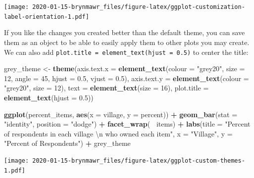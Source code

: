 \documentclass[]{book}
\newenvironment{Shaded}{\begin{snugshade}}{\end{snugshade}}
\newcommand{\KeywordTok}[1]{\textcolor[rgb]{0.13,0.29,0.53}{\textbf{#1}}}
\newcommand{\DataTypeTok}[1]{\textcolor[rgb]{0.13,0.29,0.53}{#1}}
\newcommand{\DecValTok}[1]{\textcolor[rgb]{0.00,0.00,0.81}{#1}}
\newcommand{\FloatTok}[1]{\textcolor[rgb]{0.00,0.00,0.81}{#1}}
\newcommand{\CharTok}[1]{\textcolor[rgb]{0.31,0.60,0.02}{#1}}
\newcommand{\StringTok}[1]{\textcolor[rgb]{0.31,0.60,0.02}{#1}}
\newcommand{\OperatorTok}[1]{\textcolor[rgb]{0.81,0.36,0.00}{\textbf{#1}}}
\newcommand{\NormalTok}[1]{#1}
\begin{document}
\texttt{[image: 2020-01-15-brynmawr\_files/figure-latex/ggplot-customization-label-orientation-1.pdf]}

If you like the changes you created better than the default theme, you
can save them as an object to be able to easily apply them to other
plots you may create. We can also add
\texttt{plot.title\ =\ element\_text(hjust\ =\ 0.5)} to center the
title:

\begin{Shaded}
\begin{Highlighting}[]
\NormalTok{grey_theme <-}\StringTok{ }\KeywordTok{theme}\NormalTok{(}\DataTypeTok{axis.text.x =} \KeywordTok{element_text}\NormalTok{(}\DataTypeTok{colour =} \StringTok{"grey20"}\NormalTok{, }\DataTypeTok{size =} \DecValTok{12}\NormalTok{, }\DataTypeTok{angle =} \DecValTok{45}\NormalTok{, }\DataTypeTok{hjust =} \FloatTok{0.5}\NormalTok{, }\DataTypeTok{vjust =} \FloatTok{0.5}\NormalTok{),}
                    \DataTypeTok{axis.text.y =} \KeywordTok{element_text}\NormalTok{(}\DataTypeTok{colour =} \StringTok{"grey20"}\NormalTok{, }\DataTypeTok{size =} \DecValTok{12}\NormalTok{),}
                    \DataTypeTok{text =} \KeywordTok{element_text}\NormalTok{(}\DataTypeTok{size =} \DecValTok{16}\NormalTok{),}
                    \DataTypeTok{plot.title =} \KeywordTok{element_text}\NormalTok{(}\DataTypeTok{hjust =} \FloatTok{0.5}\NormalTok{))}


\KeywordTok{ggplot}\NormalTok{(percent_items, }\KeywordTok{aes}\NormalTok{(}\DataTypeTok{x =}\NormalTok{ village, }\DataTypeTok{y =}\NormalTok{ percent)) }\OperatorTok{+}
\StringTok{    }\KeywordTok{geom_bar}\NormalTok{(}\DataTypeTok{stat =} \StringTok{"identity"}\NormalTok{, }\DataTypeTok{position =} \StringTok{"dodge"}\NormalTok{) }\OperatorTok{+}
\StringTok{    }\KeywordTok{facet_wrap}\NormalTok{(}\OperatorTok{~}\StringTok{ }\NormalTok{items) }\OperatorTok{+}
\StringTok{    }\KeywordTok{labs}\NormalTok{(}\DataTypeTok{title =} \StringTok{"Percent of respondents in each village }\CharTok{\textbackslash{}n}\StringTok{ who owned each item"}\NormalTok{,}
         \DataTypeTok{x =} \StringTok{"Village"}\NormalTok{,}
         \DataTypeTok{y =} \StringTok{"Percent of Respondents"}\NormalTok{) }\OperatorTok{+}
\StringTok{    }\NormalTok{grey_theme}
\end{Highlighting}
\end{Shaded}

\texttt{[image: 2020-01-15-brynmawr\_files/figure-latex/ggplot-custom-themes-1.pdf]}
\end{document}
